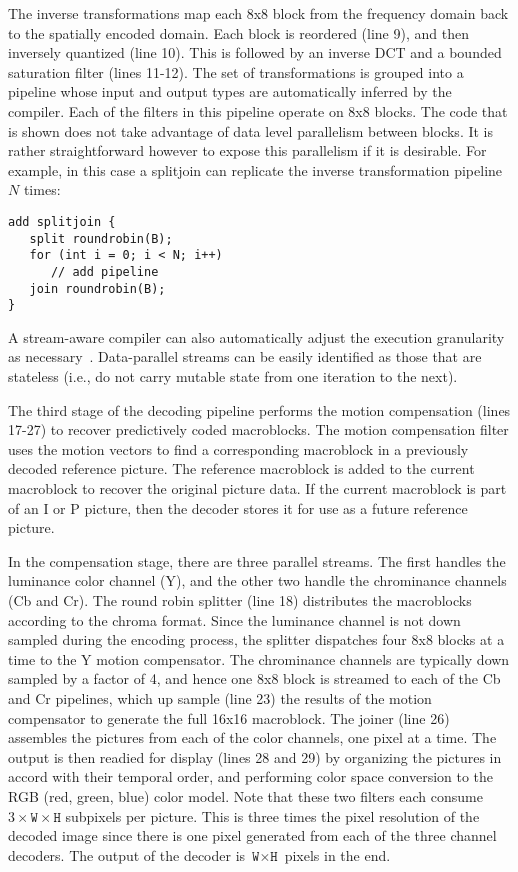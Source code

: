The inverse transformations map each 8x8 block from the frequency
domain back to the spatially encoded domain. Each block is reordered
(line 9), and then inversely quantized (line 10). This is followed by
an inverse DCT and a bounded saturation filter (lines 11-12). The set
of transformations is grouped into a pipeline whose input
and output types are automatically inferred by the compiler. Each of
the filters in this pipeline operate on 8x8 blocks. The code that is
shown does not take advantage of data level parallelism between
blocks. It is rather straightforward however to expose this
parallelism if it is desirable. For example, in this case a splitjoin
can replicate the inverse transformation pipeline $N$ times:
\begin{center}
\begin{verbatim}
add splitjoin {
   split roundrobin(B);
   for (int i = 0; i < N; i++) 
      // add pipeline
   join roundrobin(B);
}
\end{verbatim}
\end{center}
A stream-aware compiler can also automatically adjust the execution
granularity as necessary~\cite{gordo-asplos}.  Data-parallel streams
can be easily identified as those that are stateless (i.e., do not
carry mutable state from one iteration to the next).

The third stage of the decoding pipeline performs the motion
compensation (lines 17-27) to recover predictively coded
macroblocks. The motion compensation filter uses the motion vectors to
find a corresponding macroblock in a previously decoded reference
picture. The reference macroblock is added to the current macroblock
to recover the original picture data. If the current macroblock is
part of an I or P picture, then the decoder stores it for use as a
future reference picture.

In the compensation stage, there are three parallel streams. 
The first handles the luminance color channel (Y), and the
other two handle the chrominance channels (Cb and Cr). The round robin
splitter (line 18) distributes the macroblocks according to the chroma
format. Since the luminance channel is not down sampled during the
encoding process, the splitter dispatches four 8x8 blocks at a time to
the Y motion compensator. The chrominance channels are typically down
sampled by a factor of 4, and hence one 8x8 block is streamed to each
of the Cb and Cr pipelines, which up sample (line 23) the results of
the motion compensator to generate the full 16x16 macroblock.  The
joiner (line 26) assembles the pictures from each of the color
channels, one pixel at a time. The output is then readied for display
(lines 28 and 29) by organizing the pictures in accord with their
temporal order, and performing color space conversion to the RGB (red,
green, blue) color model. Note that these two filters each consume
$3\times\texttt{W}\times\texttt{H}$ subpixels per picture. This is three
times the pixel resolution of the decoded image since there is one
pixel generated from each of the three channel decoders. The output of
the decoder is $\texttt{W}\times\texttt{H}$ pixels in the end.


